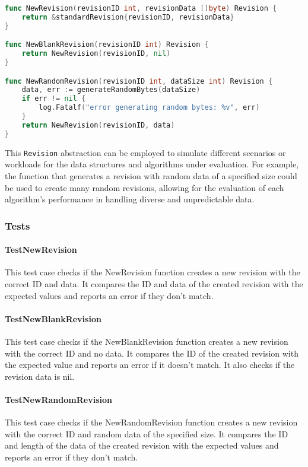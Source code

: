 \begin{lstlisting}[language=Go]
func NewRevision(revisionID int, revisionData []byte) Revision {
	return &standardRevision{revisionID, revisionData}
}

func NewBlankRevision(revisionID int) Revision {
	return NewRevision(revisionID, nil)
}

func NewRandomRevision(revisionID int, dataSize int) Revision {
	data, err := generateRandomBytes(dataSize)
	if err != nil {
		log.Fatalf("error generating random bytes: %v", err)
	}
	return NewRevision(revisionID, data)
}
\end{lstlisting}
\medskip

This \lstinline{Revision} abstraction can be employed to simulate different scenarios or workloads for the data structures and algorithms under evaluation. For example, the function that generates a revision with random data of a specified size could be used to create many random revisions, allowing for the evaluation of each algorithm's performance in handling diverse and unpredictable data.

\subsubsection{Tests}
\paragraph{TestNewRevision}
This test case checks if the NewRevision function creates a new revision with the correct ID and data. It compares the ID and data of the created revision with the expected values and reports an error if they don't match.

\paragraph{TestNewBlankRevision}
This test case checks if the NewBlankRevision function creates a new revision with the correct ID and no data. It compares the ID of the created revision with the expected value and reports an error if it doesn't match. It also checks if the revision data is nil.

\paragraph{TestNewRandomRevision}
This test case checks if the NewRandomRevision function creates a new revision with the correct ID and random data of the specified size. It compares the ID and length of the data of the created revision with the expected values and reports an error if they don't match.

